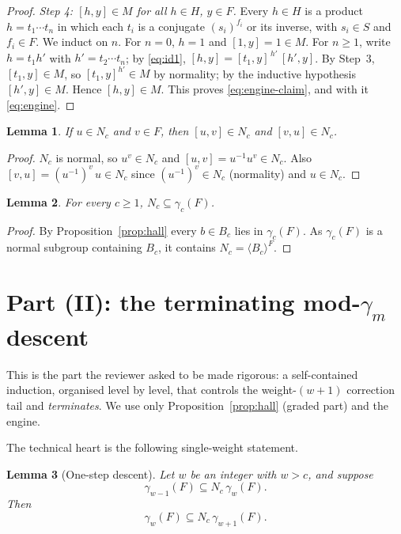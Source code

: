 \documentclass{amsart}
\newtheorem{lemma}{Lemma}
\theoremstyle{definition}
\theoremstyle{remark}
\begin{document}
\begin{proof}
\smallskip
\emph{Step 4: $[h,y]\in M$ for all $h\in H$, $y\in F$.}
Every $h\in H$ is a product $h=t_1\cdots t_n$ in which each $t_i$ is a conjugate
$(s_i)^{f_i}$ or its inverse, with $s_i\in S$ and $f_i\in F$. We induct on $n$.
For $n=0$, $h=1$ and $[1,y]=1\in M$. For $n\ge1$, write $h=t_1 h'$ with
$h'=t_2\cdots t_n$; by \eqref{eq:id1},
$[h,y]=[t_1,y]^{\,h'}\,[h',y]$. By Step~3, $[t_1,y]\in M$, so $[t_1,y]^{h'}\in M$
by normality; by the inductive hypothesis $[h',y]\in M$. Hence $[h,y]\in M$. This
proves \eqref{eq:engine-claim}, and with it \eqref{eq:engine}.
\end{proof}

\begin{lemma}\label{lem:caseA}
If $u\in N_c$ and $v\in F$, then $[u,v]\in N_c$ and $[v,u]\in N_c$.
\end{lemma}

\begin{proof}
$N_c$ is normal, so $u^{v}\in N_c$ and $[u,v]=u^{-1}u^{v}\in N_c$. Also
$[v,u]=(u^{-1})^{v}\,u\in N_c$ since $(u^{-1})^{v}\in N_c$ (normality) and
$u\in N_c$.
\end{proof}

\begin{lemma}\label{lem:easy}
For every $c\ge1$, $N_c\subseteq\gamma_c(F)$.
\end{lemma}

\begin{proof}
By Proposition~\ref{prop:hall} every $b\in B_c$ lies in $\gamma_c(F)$. As
$\gamma_c(F)$ is a normal subgroup containing $B_c$, it contains
$N_c=\langle B_c\rangle^{F}$.
\end{proof}

\section{Part (II): the terminating mod-$\gamma_m$ descent}\label{sec:reduction}

This is the part the reviewer asked to be made rigorous: a self-contained
induction, organised level by level, that controls the weight-$(w{+}1)$
correction tail and \emph{terminates}. We use only
Proposition~\ref{prop:hall} (graded part) and the engine.

The technical heart is the following single-weight statement.

\begin{lemma}[One-step descent]\label{lem:onestep}
Let $w$ be an integer with $w>c$, and suppose
\begin{equation}\label{eq:hyp-w-1}
\gamma_{w-1}(F)\subseteq N_c\,\gamma_{w}(F).
\end{equation}
Then
\begin{equation}\label{eq:concl-w}
\gamma_{w}(F)\subseteq N_c\,\gamma_{w+1}(F).
\end{equation}
\end{lemma}
\end{document}
